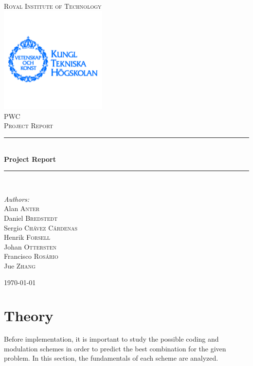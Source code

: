\documentclass[12pt,a4paper,openright]{article}
\newcommand{\HRule}{\rule{\linewidth}{0.5mm}}
\begin{document}
\begin{titlepage}
\begin{center}
\textsc{\LARGE Royal Institute of Technology}\\[0.3cm]
\includegraphics[width=0.4\textwidth]{./logo}~\\[0.3cm]


\textsc{\Large PWC \\ Project Report}\\[0.5cm]

\HRule \\[0.4cm]
{ \huge \bfseries Project Report \\[0.4cm] }

\HRule \\[1.5cm]

\begin{minipage}{0.4\textwidth}
\begin{flushleft} \large
\emph{Authors:}\\
Alan \textsc{Anter} \\
Daniel \textsc{Bredstedt}\\
Sergio \textsc{Chávez Cárdenas}\\
Henrik \textsc{Forsell}\\
Johan \textsc{Ottersten}\\
Francisco \textsc{Rosário}\\
Jue \textsc{Zhang}\\

\end{flushleft}
\end{minipage}
\vfill
{\large \today}



\end{center}
\end{titlepage}


\section{Theory}
Before implementation, it is important to study the possible coding and modulation schemes in order to predict the best combination for the given problem. In this section, the fundamentals of each scheme are analyzed.
\end{document}
